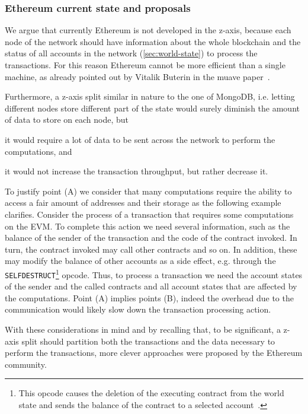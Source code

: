 \subsubsection{Ethereum current state and proposals}
We argue that currently Ethereum is not developed in the z-axis, because each
node of the network should have information about the whole blockchain and the
status of all accounts in the network (\autoref{sec:world-state}) to process the
transactions. For this reason Ethereum cannot be more efficient than a single
machine, as already pointed out by Vitalik Buterin in the muave
paper~\cite{bib:mauve}.

Furthermore, a z-axis split similar in nature to the one of MongoDB, i.e.
letting different nodes store different part of the state would surely diminish
the amount of data to store on each node, but
\begin{enumerate*}[label=(\Alph*)]
  \item it would require a lot of data to be sent across the network to perform
  the computations, and
  \item it would not increase the transaction throughput, but rather decrease it.
\end{enumerate*}
To justify point (A) we consider that many computations require the ability to
access a fair amount of addresses and their storage as the following example
clarifies. Consider the process of a transaction that requires some
computations on the EVM. To complete this action we need several information,
such as the balance of the sender of the transaction and the code of the
contract invoked. In turn, the contract invoked may call other contracts and so
on. In addition, these may modify the balance of other accounts as a side
effect, e.g. through the \texttt{SELFDESTRUCT}\footnote{This opcode causes the
deletion of the executing contract from the world state and sends the balance of
the contract to a selected account~\cite{wood2018ethereum}.} opcode. Thus, to
process a transaction we need the account states of the sender and the called
contracts and all account states that are affected by the computations. Point
(A) implies points (B), indeed the overhead due to the communication would
likely slow down the transaction processing action.

With these considerations in mind and by recalling that, to be significant, a
z-axis split should partition both the transactions and the data necessary to
perform the transactions, more clever approaches were proposed by the Ethereum
community.

